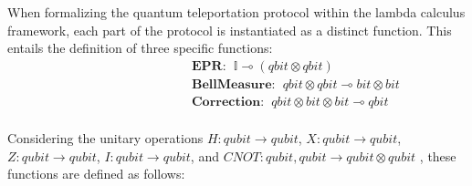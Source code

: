 When formalizing the quantum teleportation protocol within the lambda calculus framework, each part of the protocol is instantiated as a distinct function. This entails the definition of three specific functions:
\begin{align*}
   \hspace{100pt} & \textbf{EPR}: \hspace{5pt} \mathbb{I} \multimap (\textit{qbit} \otimes \textit{qbit}) \\ 
    &\textbf{BellMeasure}: \hspace{5pt} \textit{qbit} \otimes \textit{qbit}  \multimap \textit{bit} \otimes \textit{bit} \\
    &\textbf{Correction}: \hspace{5pt} \textit{qbit} \otimes \textit{bit} \otimes \textit{bit}  \multimap \textit{qbit} \\
\end{align*}

Considering the unitary operations $H: \textit{qubit} \xrightarrow{}  \textit{qubit}$, $X: \textit{qubit} \xrightarrow{}  \textit{qubit}$, $Z: \textit{qubit} \xrightarrow{}  \textit{qubit}$, $I: \textit{qubit} \xrightarrow{}  \textit{qubit}$, and $\textit{CNOT}: \textit{qubit}, \textit{qubit} \xrightarrow{}  \textit{qubit} \otimes \textit{qubit}$ , these functions are defined as follows:

